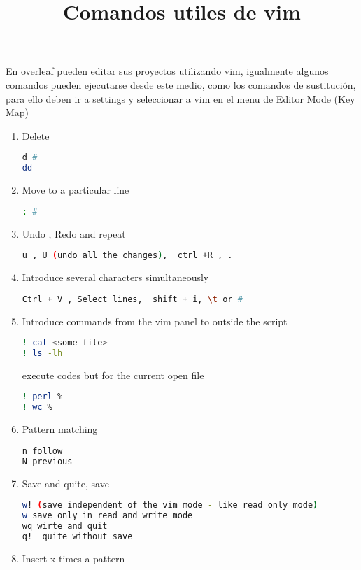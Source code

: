 \documentclass{article}
\title{\textbf{Comandos utiles de vim}\vspace{-5ex}}
\date{\vspace{-1ex}}
\begin{document}
\maketitle
\noindent
En overleaf pueden editar sus proyectos utilizando vim, igualmente algunos comandos pueden ejecutarse desde este medio, como los comandos de sustitución, para ello deben ir a settings y seleccionar a vim en el menu de Editor Mode (Key Map)
\begin{enumerate}
\item Delete 
\begin{lstlisting}[language=bash]
d # 
dd 
\end{lstlisting}
\item Move to a particular line
 \begin{lstlisting}[language=bash]
 : # 
 \end{lstlisting}
\item Undo , Redo  and repeat 
\begin{lstlisting}[language=bash]
u , U (undo all the changes),  ctrl +R , . 
\end{lstlisting}
\item Introduce several characters simultaneously 
\begin{lstlisting}[language=bash]
 Ctrl + V , Select lines,  shift + i, \t or # 
\end{lstlisting}
\item  Introduce commands from the vim panel to outside the script  
\begin{lstlisting}[language=bash]
! cat <some file> 
! ls -lh 
 \end{lstlisting}

execute codes but for the current open file  
\begin{lstlisting}[language=bash]
! perl %
! wc %
 \end{lstlisting}
\item  Pattern matching 
\begin{lstlisting}[language=bash]
%s/<pattern syntax like perl>/<replace by>/g(lobal)  or c(case by case) 
n follow
N previous 
\end{lstlisting}
\item  Save and quite, save
\begin{lstlisting}[language=bash]
w! (save independent of the vim mode - like read only mode) 
w save only in read and write mode
wq wirte and quit 
q!  quite without save 
\end{lstlisting}
\item  Insert x times a pattern 


\end{enumerate}
\end{document}
